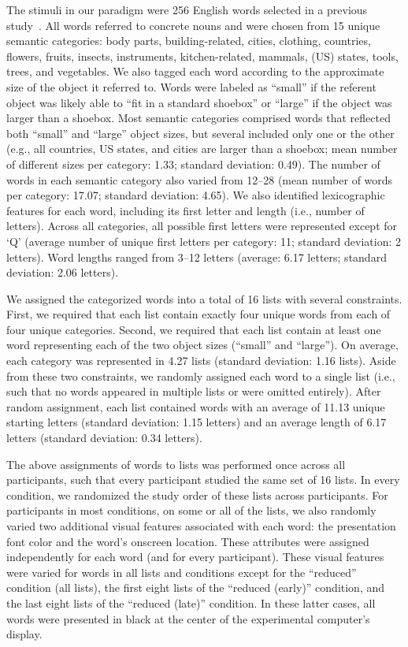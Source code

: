\documentclass[11pt]{article}
\begin{document}
The stimuli in our paradigm were 256 English words selected in a previous
study~\citep{ZimaEtal18}. All words referred to concrete nouns and were
chosen from 15 unique semantic categories: body parts, building-related,
cities, clothing, countries, flowers, fruits, insects, instruments,
kitchen-related, mammals, (US) states, tools, trees, and vegetables. We also
tagged each word according to the approximate size of the object it
referred to. Words were labeled as ``small'' if the referent object was
likely able to ``fit in a standard shoebox'' or ``large'' if the object was
larger than a shoebox. Most semantic categories comprised words that reflected
both ``small'' and ``large'' object sizes, but several included only one or the
other (e.g., all countries, US states, and cities are larger than a shoebox;
mean number of different sizes per category: 1.33; standard deviation: 0.49).
The number of words in each semantic category also varied from 12--28 (mean
number of words per category: 17.07; standard deviation: 4.65).
We also identified lexicographic features for each word, including its
first letter and length (i.e., number of letters). Across all categories, all
possible first letters were represented except for `Q' (average number of
unique first letters per category: 11; standard deviation: 2 letters). Word
lengths ranged from 3--12 letters (average: 6.17 letters; standard deviation:
2.06 letters).

We assigned the categorized words into a total of 16 lists with several
constraints. First, we required that each list contain exactly four unique words
from each of four unique categories.
Second, we required that each list contain at least one word representing each
of the two object sizes (``small'' and ``large''). On average, each category was
represented in 4.27 lists (standard deviation: 1.16 lists). Aside from these
two constraints, we randomly assigned each word to a single list (i.e., such that
no words appeared in multiple lists or were omitted entirely). After random
assignment, each list contained words with an average of 11.13 unique starting
letters (standard deviation: 1.15 letters) and an average length of 6.17
letters (standard deviation: 0.34 letters).

The above assignments of words to lists was performed once across all
participants, such that every participant studied the same set of 16 lists. In
every condition, we randomized the study order of these lists across
participants. For participants in most conditions, on some or all of the lists,
we also randomly varied two additional visual features associated with each
word: the presentation font color and the word's onscreen location. These
attributes were assigned independently for each word (and for every
participant). These visual features were varied for words in all lists and
conditions except for the ``reduced'' condition (all lists), the first eight
lists of the ``reduced (early)'' condition, and the last eight lists of the
``reduced (late)'' condition. In these latter cases, all words were presented
in black at the center of the experimental computer's display.
\end{document}

